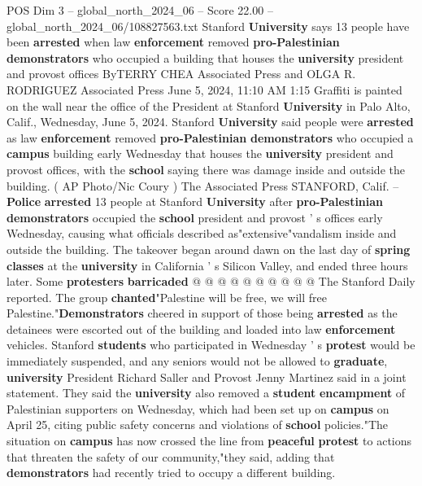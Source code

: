\begin{textsample}{POS Dim 3 – global\_north\_2024\_06 – Score 22.00 – global\_north\_2024\_06/108827563.txt}  \label{ex:f3_pos_070}
Stanford \textbf{University} says 13 people have been \textbf{arrested} when law \textbf{enforcement} removed \textbf{pro-Palestinian} \textbf{demonstrators} who occupied a building that houses the \textbf{university} president and provost offices ByTERRY CHEA Associated Press and OLGA R.
RODRIGUEZ Associated Press June 5, 2024, 11:10 AM 1:15 Graffiti is painted on the wall near the office of the President at Stanford \textbf{University} in Palo Alto, Calif., Wednesday, June 5, 2024.
Stanford \textbf{University} said people were \textbf{arrested} as law \textbf{enforcement} removed \textbf{pro-Palestinian} \textbf{demonstrators} who occupied a \textbf{campus} building early Wednesday that houses the \textbf{university} president and provost offices, with the \textbf{school} saying there was damage inside and outside the building. ( AP Photo/Nic Coury ) The Associated Press STANFORD, Calif. -- \textbf{Police} \textbf{arrested} 13 people at Stanford \textbf{University} after \textbf{pro-Palestinian} \textbf{demonstrators} occupied the \textbf{school} president and provost ' s offices early Wednesday, causing what officials described as"extensive"vandalism inside and outside the building.
The takeover began around dawn on the last day of \textbf{spring} \textbf{classes} at the \textbf{university} in California ' s Silicon Valley, and ended three hours later.
Some \textbf{protesters} \textbf{barricaded} @ @ @ @ @ @ @ @ @ @ The Stanford Daily reported.
The group \textbf{chanted}"Palestine will be free, we will free Palestine."\textbf{Demonstrators} cheered in support of those being \textbf{arrested} as the detainees were escorted out of the building and loaded into law \textbf{enforcement} vehicles.
Stanford \textbf{students} who participated in Wednesday ' s \textbf{protest} would be immediately suspended, and any seniors would not be allowed to \textbf{graduate}, \textbf{university} President Richard Saller and Provost Jenny Martinez said in a joint statement.
They said the \textbf{university} also removed a \textbf{student} \textbf{encampment} of Palestinian supporters on Wednesday, which had been set up on \textbf{campus} on April 25, citing public safety concerns and violations of \textbf{school} policies."The situation on \textbf{campus} has now crossed the line from \textbf{peaceful} \textbf{protest} to actions that threaten the safety of our community,"they said, adding that \textbf{demonstrators} had recently tried to occupy a different building.

\end{textsample}
